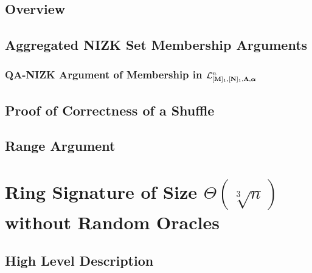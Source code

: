     \section{Overview} \label{sec:shuf-rp-overview}

        

    \section{Aggregated NIZK Set Membership Arguments} \label{sec:aZKSMP}

        

        \subsection{QA-NIZK Argument of Membership in $\mathcal{L}_{[\mathbf{{M}}]_1,[\mathbf{{N}}]_1,\mathbf{{\Lambda}},{\boldsymbol \alpha}}^n$} \label{sec:bin-lan-constr}

            

    \section{Proof of Correctness of a Shuffle} \label{sec:shuffle}

        

    \section{Range Argument} \label{sec:range-proof}

        


%    

\chapter{Ring Signature of Size $\Theta(\sqrt[3]{n})$ without Random O\-ra\-cles} \label{sec:opt-rs}

    
    
    \section{High Level Description}
        

